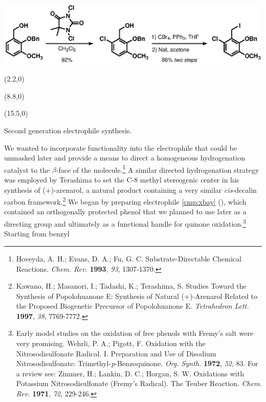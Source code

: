 \begin{Scheme}[b]
  \centering
  \includegraphics[scale=0.8]{chp_singlecarbon/images/gentwoelectrophile}
  \begin{textblock}{1}(2.2,0)  \end{textblock}
  \begin{textblock}{1}(8.8,0)  \end{textblock}
  \begin{textblock}{1}(15.5,0)  \end{textblock}
  \caption{Second generation electrophile synthesis.}
  \label{sch:ephiletwo}
\end{Scheme}
We wanted to incorporate functionality into the electrophile that could be unmasked later and
provide a means to direct a homogeneous hydrogenation catalyst to the $\beta$-face of the
molecule.\footnote{{\frenchspacing Hoveyda, A.
H.; Evans, D.
A.; Fu, G.
C.
Substrate-Directable Chemical Reactions. \textit{Chem. Rev.} \textbf{1993}, \textit{93},
1307-1370.}} A similar directed hydrogenation strategy was employed by Terashima to set the C-8
methyl stereogenic center in his synthesis of ($+$)-arenarol, a natural product containing a very
similar \textit{cis}-decalin carbon framework.\footnote{{\frenchspacing Kawano, H.; Masanori, I.;
Tadashi, K.; Terashima, S. Studies Toward the Synthesis of Popolohuanone E: Synthesis of Natural
(+)-Arenarol Related to the Proposed Biogenetic Precursor of Popolohuanone E.
\textit{Tetrahedron Lett.} \textbf{1997}, \textit{38}, 7769-7772.}} We began by preparing
electrophile \ref{cmp:xbay} (), which contained an orthogonally protected
phenol that we planned to use later as a directing group and ultimately as a functional handle for
quinone oxidation.\footnote{Early model studies on the oxidation of free phenols with Fremy's salt
were very promising. {\frenchspacing Wehrli, P.
A.; Pigott, F.
Oxidation with the Nitrosodisulfonate Radical. I. Preparation and Use of Disodium
Nitrosodisulfonate: Trimethyl-\textit{p}-Benzoquinone.
\textit{Org. Synth.} \textbf{1972}, \textit{52}, 83.} For a review see: {\frenchspacing Zimmer, H.;
Lankin, D. C.; Horgan, S. W. Oxidations with Potassium Nitrosodisulfonate (Fremy's Radical). The
Teuber Reaction. \textit{Chem. Rev.} \textbf{1971}, \textit{72}, 229-246.}} Starting from benzyl
